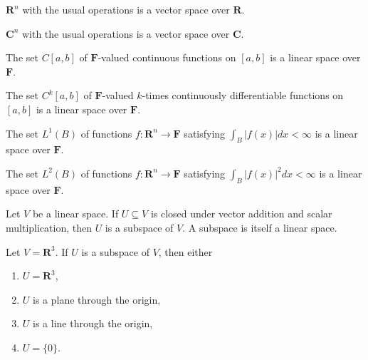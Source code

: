 \documentclass{report}
\begin{document}
    \begin{Example}
    $\mathbf{R}^{n}$ with the usual operations is a vector space over $\mathbf{R}$.
    \end{Example}

    \begin{Example}
    $\mathbf{C}^{n}$ with the usual operations is a vector space over $\mathbf{C}$.
    \end{Example}

    \begin{Example}
    The set $C[a, b]$ of $\mathbf{F}$-valued continuous functions on $[a, b]$ is a linear space over $\mathbf{F}$.
    \end{Example}

    \begin{Example}
    The set $C^{k}[a, b]$ of $\mathbf{F}$-valued $k$-times continuously differentiable functions on $[a, b]$ is a linear space over $\mathbf{F}$.
    \end{Example}

    \begin{Example}
    The set $L^{1}(B)$ of functions $f: \mathbf{R}^{n} \rightarrow \mathbf{F}$ satisfying $\int_{B}|f(x)| dx < \infty$ is a linear space over $\mathbf{F}$.
    \end{Example}

    \begin{Example}
    The set $L^{2}(B)$ of functions $f: \mathbf{R}^{n} \rightarrow \mathbf{F}$ satisfying $\int_{B}|f(x)|^{2} dx < \infty$ is a linear space over $\mathbf{F}$.
    \end{Example}

    \begin{defBox}
    Let $V$ be a linear space. If $U \subseteq V$ is closed under vector addition and scalar multiplication, then $U$ is a subspace of $V$. A subspace is itself a linear space.
    \end{defBox}

    \begin{Example}
    Let $V=\mathbf{R}^{3}$. If $U$ is a subspace of $V$, then either
    \begin{enumerate}
        \item $U = \mathbf{R}^{3}$,
        \item $U$ is a plane through the origin,
        \item $U$ is a line through the origin,
        \item $U = \{0\}$.
    \end{enumerate}
    \end{Example}
\end{document}
